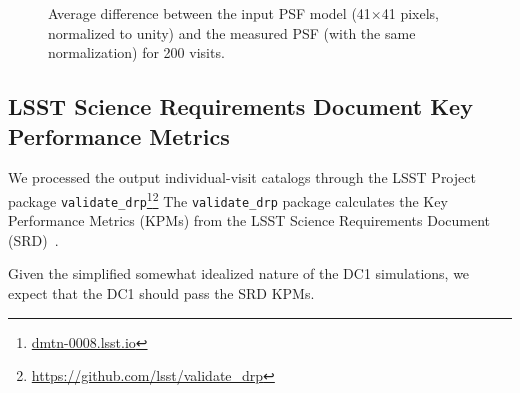 \documentclass[\docopts]{\docclass}
\begin{document}
\begin{figure}
\centering
{}

\caption{Average difference between the input PSF model (41$\times$41 pixels, normalized to unity) and the measured PSF (with the same normalization) for 200 visits.}
\label{fig:psf_residual}
\end{figure}

\subsection{LSST Science Requirements Document Key Performance Metrics}

We processed the output individual-visit catalogs through the LSST Project package \texttt{validate\_drp}\footnote{\url{dmtn-0008.lsst.io}}\footnote{\url{https://github.com/lsst/validate_drp}}
The \texttt{validate\_drp} package calculates the Key Performance Metrics (KPMs) from the LSST Science Requirements Document (SRD)~\citep{LPM-17}.

Given the simplified somewhat idealized nature of the DC1 simulations, we expect that the DC1 should pass the SRD KPMs.
\end{document}
